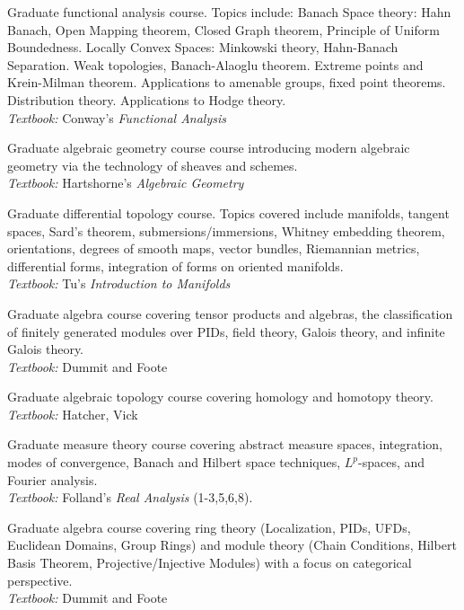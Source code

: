\documentclass[11pt,letterpaper,sans]{moderncv}
\begin{document}
%
  {Graduate functional analysis course. Topics include: Banach Space theory: Hahn Banach, Open Mapping theorem, Closed Graph theorem, Principle of Uniform Boundedness. Locally Convex Spaces: Minkowski theory, Hahn-Banach Separation. Weak topologies, Banach-Alaoglu theorem. Extreme points and Krein-Milman theorem. Applications to amenable groups, fixed point theorems. Distribution theory. Applications to Hodge theory.\\ \emph{Textbook: }Conway's \emph{Functional Analysis}}

%
  {Graduate algebraic geometry course course introducing modern algebraic geometry via the technology of sheaves and schemes.  \\ \emph{Textbook: }Hartshorne's \emph{Algebraic Geometry}}

%
  {Graduate differential topology course. Topics covered include manifolds, tangent spaces, Sard's theorem, submersions/immersions, Whitney embedding theorem, orientations, degrees of smooth maps, vector bundles, Riemannian metrics, differential forms, integration of forms on oriented manifolds. \\ \emph{Textbook: }Tu's \emph{Introduction to Manifolds}}

%
  {Graduate algebra course covering tensor products and algebras, the classification of finitely generated modules over PIDs, field theory, Galois theory, and infinite Galois theory.  \\ \emph{Textbook: }Dummit and Foote}

%
  {Graduate algebraic topology course covering homology and homotopy theory.  \\ \emph{Textbook: }Hatcher, Vick}

%
  {Graduate measure theory course covering abstract measure spaces, integration, modes of convergence, Banach and Hilbert space techniques, $L^p$-spaces, and Fourier analysis. \\ \emph{Textbook: }Folland's \emph{Real Analysis} (1-3,5,6,8).}

%
  {Graduate algebra course covering ring theory (Localization, PIDs, UFDs, Euclidean Domains, Group Rings) and module theory (Chain Conditions, Hilbert Basis Theorem, Projective/Injective Modules) with a focus on categorical perspective.   \\ \emph{Textbook: }Dummit and Foote}
\end{document}
